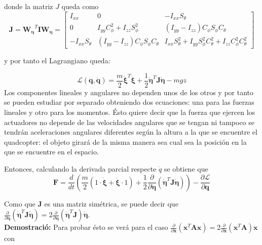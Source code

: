 \documentclass[twoside]{article}
\begin{document}
donde la matriz $J$ queda como
\begin{equation}
\pmb{J}=\pmb{W_\eta} ^{T}\pmb{I}\pmb{W_\eta} = \left[ \begin{array}{ccc}
I_{xx} & 0 & -I_{xx} S_\theta \\
0 & I_{yy} C^2_\phi + I_{zz} S^2_\phi & (I_{yy}-I_{zz}) C_{\phi} S_\phi C_\theta \\
-I_{xx} S_\theta & (I_{yy}-I_{zz}) C_{\phi} S_\phi C_\theta & I_{xx} S^2_{\theta}+I_{yy} S^2_{\phi} C^2_\theta +I_{zz}C^2_{\phi} C^2_{\theta}
\end{array} \right]
\end{equation} 

y por tanto el Lagrangiano queda:

\begin{equation}
\mathcal{L}(\pmb{q},\pmb{\dot{q}})=\frac{m}{2} \pmb{\dot{\xi}}^T \pmb{\dot{\xi}} + \frac{1}{2}\pmb{\dot{\eta}}^{T}\pmb{J}\pmb{\dot{\eta}} - mgz
\end{equation}
Los componentes lineales y angulares no dependen unos de los otros y por tanto se pueden estudiar por separado obteniendo dos ecuaciones: una para las fuerzas lineales y otro para los momentos. Ésto quiere decir que la fuerza que ejercen los actuadores no depende de las velocidades angulares que se tengan ni tampoco se tendrán aceleraciones angulares diferentes según la altura a la que se encuentre el quadcopter: el objeto girará de la misma manera sea cual sea la  posición en la que se encuentre en el espacio.

Entonces, calculando la derivada parcial respecte $\dot{q}$ se obtiene que 
\begin{equation}
\pmb{F}=\frac{d}{dt}\left(\frac{m}{2}(1\cdot \pmb{ \dot{\xi}}+\pmb{\dot{\xi}}\cdot 1)+\frac{1}{2}\frac{\partial}{\partial \pmb{\dot{\eta}}}(\pmb{\dot{\eta}}^{T}\pmb{J}\pmb{\dot{\eta}})\right)-\frac{\partial \mathcal{L}}{\partial \pmb{q}}
\end{equation}

Como que $\pmb{J}$ es una matriz simétrica, se puede decir que  $\frac{\partial}{\partial \pmb{\dot{\eta}}}(\pmb{\dot{\eta}}^{T}\pmb{J}\pmb{\dot{\eta}})=2 \frac{\partial}{\partial \pmb{\dot{\eta}}}(\pmb{\dot{\eta}}^{T}\pmb{J})\pmb{\dot{\eta}} $. \\

\textbf{Demostració:} Para probar ésto se verá para el caso $\frac{\partial}{\partial \pmb{x}}(\pmb{x}^{T}\pmb{A}\pmb{x})=2 \frac{\partial}{\partial \pmb{x}}(\pmb{x}^{T}\pmb{A})\pmb{x} $ con 
\end{document}
